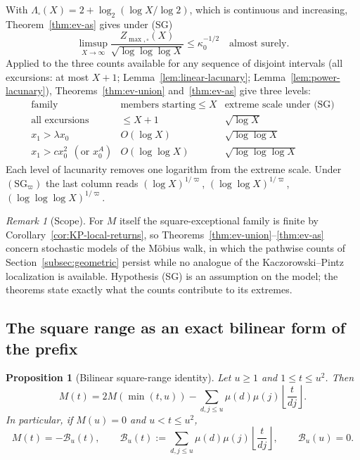 \documentclass[11pt]{amsart}
\numberwithin{equation}{section}
\theoremstyle{plain}
\newtheorem{proposition}[theorem]{Proposition}
\theoremstyle{definition}
\theoremstyle{remark}
\newtheorem{remark}[theorem]{Remark}
\begin{document}
With $\Lambda_\square(X)=2+\log_2(\log X/\log2)$, which is continuous and
increasing, Theorem~\ref{thm:ev-as} gives under (SG)
\[
\limsup_{X\to\infty}\frac{Z_{\max,\square}(X)}{\sqrt{\log\log\log X}}\le \kappa_0^{-1/2}
\quad\text{almost surely.}
\]
Applied to the three counts available for any sequence of disjoint
intervals (all excursions: at most $X+1$; Lemma~\ref{lem:linear-lacunary};
Lemma~\ref{lem:power-lacunary}), Theorems~\ref{thm:ev-union}
and~\ref{thm:ev-as} give three levels:
\[
\begin{array}{c|c|c}
\text{family} & \text{members starting}\le X & \text{extreme scale under (SG)}\\
\hline
\text{all excursions} & \le X+1 & \sqrt{\log X}\\
x_1>\lambda x_0 & O(\log X) & \sqrt{\log\log X}\\
x_1>cx_0^2\ \ (\text{or }x_0^A) & O(\log\log X) & \sqrt{\log\log\log X}
\end{array}
\]
Each level of lacunarity removes one logarithm from the extreme scale.
Under $(\mathrm{SG}_\varpi)$ the last column reads $(\log X)^{1/\varpi}$,
$(\log\log X)^{1/\varpi}$, $(\log\log\log X)^{1/\varpi}$.

\begin{remark}[Scope]
\label{rem:ev-scope}
For $M$ itself the square-exceptional family is finite by
Corollary~\ref{cor:KP-local-returns}, so
Theorems~\ref{thm:ev-union}--\ref{thm:ev-as} concern stochastic models of
the M\"obius walk, in which the pathwise counts of
Section~\ref{subsec:geometric} persist while no analogue of the
Kaczorowski--Pintz localization is available. Hypothesis (SG) is an
assumption on the model; the theorems state exactly what the counts
contribute to its extremes.
\end{remark}

\subsection{The square range as an exact bilinear form of the prefix}

\begin{proposition}[Bilinear square-range identity]
\label{prop:prefix-bilinear}
Let $u\ge1$ and $1\le t\le u^2$. Then
\begin{equation}
\label{eq:bilinear-general}
M(t)=2M(\min(t,u))-
\sum_{d,j\le u}\mu(d)\mu(j)\left\lfloor\frac{t}{dj}\right\rfloor.
\end{equation}
In particular, if $M(u)=0$ and $u<t\le u^2$,
\begin{equation}
\label{eq:bilinear-excursion}
M(t)=-\mathcal B_u(t),\qquad
\mathcal B_u(t):=\sum_{d,j\le u}\mu(d)\mu(j)
\left\lfloor\frac{t}{dj}\right\rfloor,
\qquad \mathcal B_u(u)=0.
\end{equation}
\end{proposition}
\end{document}
